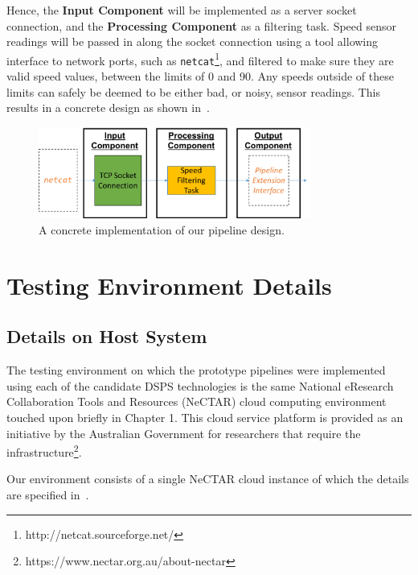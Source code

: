 Hence, the \textbf{Input Component} will be implemented as a server socket connection,
and the \textbf{Processing Component} as a filtering task. Speed sensor readings will be passed in along the socket connection
using a tool allowing interface to network ports, such as \texttt{netcat}\footnote{http://netcat.sourceforge.net/}, and filtered to make sure they are valid
speed values, between the limits of 0 and 90. Any speeds
outside of these limits can safely be deemed to be either bad, or noisy, sensor readings. This results in a concrete design as shown
in~.

\begin{figure}[ht]
  \centering
  \includegraphics[width=0.8\textwidth]{includes/figures/fig_pipeline_concrete}
  \caption{A concrete implementation of our pipeline design.}
  \label{fig:pipeline_concrete}
\end{figure}



\section{Testing Environment Details} %
\label{sub:testing_environment_details}

\subsection{Details on Host System} %
\label{ssub:host_system}

The testing environment on which the prototype pipelines were implemented using each of the candidate DSPS technologies
is the same National eResearch Collaboration Tools and Resources (NeCTAR) cloud computing environment touched upon
briefly in Chapter 1. This cloud service platform is provided as an initiative by the Australian Government for researchers
that require the infrastructure\footnote{https://www.nectar.org.au/about-nectar}.

Our environment consists of a single NeCTAR cloud instance of which the details are specified in~.

